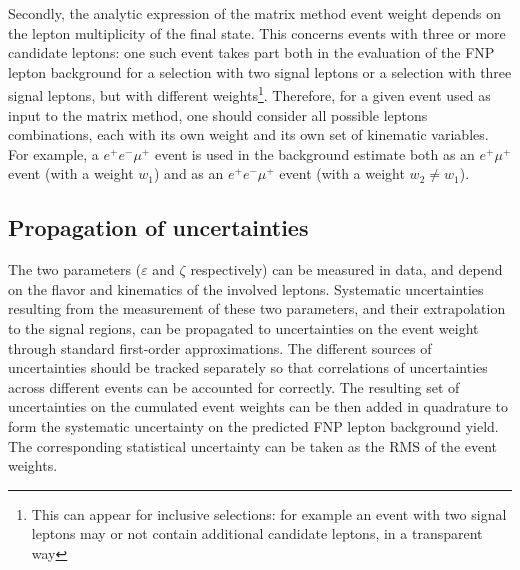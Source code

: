 Secondly, the analytic expression of the matrix method event weight depends on the lepton multiplicity of the final state. This concerns events with three or more candidate leptons: one such event takes part both in the evaluation of the FNP lepton background for a selection with two signal leptons or a selection with three signal leptons, but with different weights\footnote{This can appear for inclusive selections: for example an event with two signal leptons may or not contain additional candidate leptons, in a transparent way}. Therefore, for a given event used as input to the matrix method, one should consider all possible leptons combinations, each with its own weight and its own set of kinematic variables. For example, a $e^+e^-\mu^+$ event is used in the background estimate both as an $e^+\mu^+$ event (with a weight $w_1$) and as an $e^+e^-\mu^+$ event (with a weight $w_2\neq w_1$).  

\subsection{Propagation of uncertainties}

The two parameters ($\varepsilon$ and $\zeta$ respectively) can be measured in data, and depend on the flavor and kinematics of the involved leptons.  Systematic uncertainties resulting from the measurement of these two parameters, and their extrapolation to the signal regions, can be propagated to uncertainties on the event weight through standard first-order approximations. The different sources of uncertainties should be tracked separately so that correlations of uncertainties across different events can be accounted for correctly. The resulting set of uncertainties on the cumulated event weights can be then added in quadrature to form the systematic uncertainty on the predicted FNP lepton background yield. The corresponding statistical uncertainty can be taken as the RMS of the event weights.
